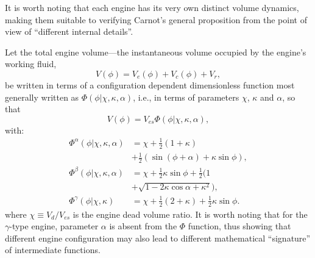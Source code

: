     It is worth noting that each engine has its very own distinct volume dynamics,  making  them
    suitable to verifying Carnot's general proposition from the point  of  view  of  ``different
    internal details''.

    Let the total engine volume---the instantaneous volume  occupied  by  the  engine's  working
    fluid,
    \begin{equation}
        V(\phi) = V_e(\phi) + V_c(\phi) + V_r,
    \end{equation}
    \noindent be written in terms of  a  configuration  dependent  dimensionless  function  most
    generally written as $\Phi(\phi | \chi, \kappa,  \alpha)$,  i.e.,  in  terms  of  parameters
    $\chi$, $\kappa$ and $\alpha$, so that
    \begin{equation}
        V(\phi) = V_{es}\Phi(\phi | \chi, \kappa, \alpha),
    \end{equation}
    \noindent with:
    \begin{align}
        \label{eq:Phia}
        \Phi^{\alpha}(\phi | \chi, \kappa, \alpha) &= \chi + \frac{1}{2}(1 + \kappa) \nonumber\\
            &+ \frac{1}{2}(\sin(\phi + \alpha) + \kappa\sin\phi),\\
        \label{eq:Phib}
        \Phi^{\beta}(\phi | \chi, \kappa, \alpha) &= \chi + \frac{1}{2}\kappa\sin\phi +
            \frac{1}{2}(1 \nonumber\\
            &+ \sqrt{1 - 2\kappa\cos\alpha + \kappa^2}),\\
        \label{eq:Phig}
        \Phi^{\gamma}(\phi | \chi, \kappa) &= \chi + \frac{1}{2}(2 + \kappa)
            + \frac{1}{2}\kappa\sin\phi.
    \end{align}
    \noindent where $\chi \equiv V_{d}/V_{es}$ is the engine dead  volume  ratio.  It  is  worth
    noting that for the $\gamma$-type engine, parameter  $\alpha$  is  absent  from  the  $\Phi$
    function, thus showing that different  engine  configuration  may  also  lead  to  different
    mathematical ``signature'' of intermediate functions.

